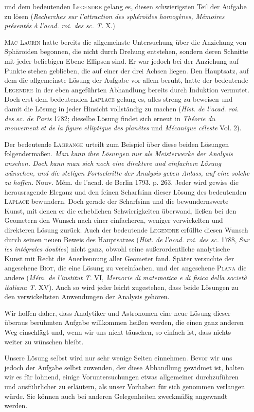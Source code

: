 und dem bedeutenden \textsc{Legendre} gelang es, diesen schwierigsten Teil der Aufgabe zu lösen (\textit{Recherches sur l’attraction des sphéroïdes homogènes, Mémoires présentés à l’acad. roi. des sc. T.} X.)

\textsc{Mac Laurin} hatte bereits die allgemeinste Untersuchung über die Anziehung von Sphäroiden begonnen, die nicht durch Drehung entstehen, sondern deren Schnitte mit jeder beliebigen Ebene Ellipsen sind. Er war jedoch bei der Anziehung auf Punkte stehen geblieben, die auf einer der drei Achsen liegen. Den Hauptsatz, auf dem die allgemeinste Lösung der Aufgabe vor allem beruht, hatte der bedeutende \textsc{Legendre} in der eben angeführten Abhandlung bereits durch Induktion vermutet. Doch erst dem bedeutenden \textsc{Laplace} gelang es, alles streng zu beweisen und damit die Lösung in jeder Hinsicht vollständig zu machen (\textit{Hist. de l’acad. roi. des sc. de Paris} 1782; dieselbe Lösung findet sich erneut in \textit{Théorie du mouvement et de la figure elliptique des planètes} und \textit{Mécanique céleste} Vol. 2).

\expandafter\def\csname HistoricalNoteText008\endcsname{Der bedeutende \textsc{Lagrange} urteilt zum Beispiel über diese beiden Lösungen folgendermaßen. \textit{Man kann ihre Lösungen nur als Meisterwerke der Analysis ansehen. Doch kann man sich noch eine direktere und einfachere Lösung wünschen, und die stetigen Fortschritte der Analysis geben Anlass, auf eine solche zu hoffen.} Nouv. Mém. de l’acad. de Berlin 1793. p. 263.}
Jeder wird gewiss die herausragende Eleganz und den feinen Scharfsinn dieser Lösung des bedeutenden \textsc{Laplace} bewundern. Doch gerade der Scharfsinn und die bewundernswerte Kunst, mit denen er die erheblichen Schwierigkeiten überwand, ließen bei den Geometern den Wunsch nach einer einfacheren, weniger verwickelten und direkteren Lösung zurück. Auch der bedeutende \textsc{Legendre} erfüllte diesen Wunsch durch seinen neuen Beweis des Hauptsatzes (\textit{Hist. de l’acad. roi. des sc.} 1788, \textit{Sur les intégrales doubles}) nicht ganz, obwohl seine außerordentliche analytische Kunst mit Recht die Anerkennung aller Geometer fand. Später versuchte der angesehene \textsc{Biot}, die eine Lösung zu vereinfachen, und der angesehene \textsc{Plana} die andere (\textit{Mém. de l’institut T.} VI, \textit{Memorie di matematica e di fisica della società italiana T.} XV). Auch so wird jeder leicht zugestehen, dass beide Lösungen zu den verwickeltsten Anwendungen der Analysis gehören.

Wir hoffen daher, dass Analytiker und Astronomen eine neue Lösung dieser überaus berühmten Aufgabe willkommen heißen werden, die einen ganz anderen Weg einschlägt und, wenn wir uns nicht täuschen, so einfach ist, dass nichts weiter zu wünschen bleibt.

Unsere Lösung selbst wird nur sehr wenige Seiten einnehmen. Bevor wir uns jedoch der Aufgabe selbst zuwenden, der diese Abhandlung gewidmet ist, halten wir es für lohnend, einige Voruntersuchungen etwas allgemeiner durchzuführen und ausführlicher zu erläutern, als unser Vorhaben für sich genommen verlangen würde. Sie können auch bei anderen Gelegenheiten zweckmäßig angewandt werden.
